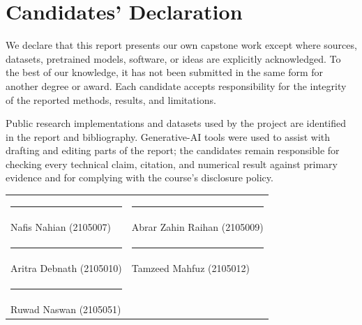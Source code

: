 \chapter*{Candidates' Declaration}

We declare that this report presents our own capstone work except where sources,
datasets, pretrained models, software, or ideas are explicitly acknowledged. To
the best of our knowledge, it has not been submitted in the same form for another
degree or award. Each candidate accepts responsibility for the integrity of the
reported methods, results, and limitations.

Public research implementations and datasets used by the project are identified
in the report and bibliography. Generative-AI tools were used to assist with
drafting and editing parts of the report; the candidates remain responsible for
checking every technical claim, citation, and numerical result against primary
evidence and for complying with the course's disclosure policy.


\vspace{18mm}
\begin{tabularx}{\textwidth}{@{}Y Y@{}}
\rule{55mm}{0.4pt} & \rule{55mm}{0.4pt}\\[-1mm]
Nafis Nahian (2105007) & Abrar Zahin Raihan (2105009)\\[14mm]
\rule{55mm}{0.4pt} & \rule{55mm}{0.4pt}\\[-1mm]
Aritra Debnath (2105010) & Tamzeed Mahfuz (2105012)\\[14mm]
\rule{55mm}{0.4pt} & \\
Ruwad Naswan (2105051) &
\end{tabularx}

\clearpage

